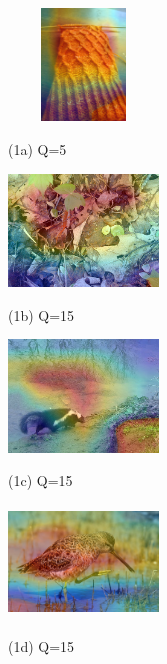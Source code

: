 \begin{figure}[htbp]
    \begin{minipage}{0.2\linewidth}
        \centerline{\includegraphics[width=4.0cm, height=3.0cm]{figures/robust_figure1.png}}
        \centerline{(1a) Q=5}
    \end{minipage}
    \hfill
    \begin{minipage}{0.2\linewidth}
        \centerline{\includegraphics[width=4.0cm, height=3.0cm]{figures/robust_figure2.png}}
        \centerline{(1b) Q=15}
    \end{minipage}
    \hfill
    \begin{minipage}{0.2\linewidth}
        \centerline{\includegraphics[width=4.0cm, height=3.0cm]{figures/robust_figure3.png}}
        \centerline{(1c) Q=15}
    \end{minipage}
    \hfill
    \begin{minipage}{0.2\linewidth}
        \centerline{\includegraphics[width=4.0cm, height=3.0cm]{figures/robust_figure4.png}}
        \centerline{(1d) Q=15}
    \end{minipage}
    
    \vfill
    \vspace{0.4cm}
    

\end{figure}
